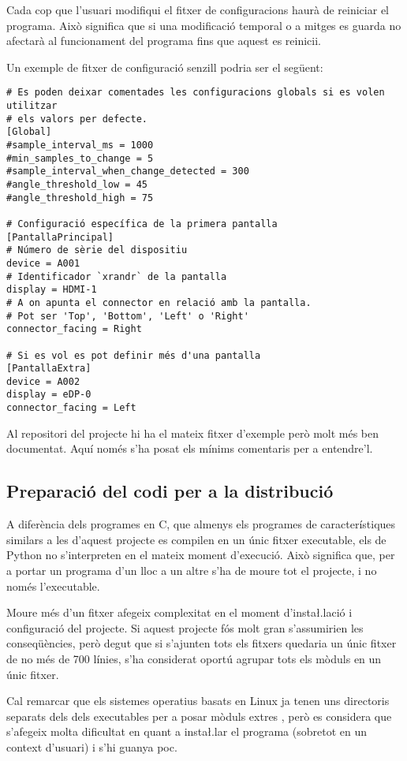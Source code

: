 Cada cop que l'usuari modifiqui el fitxer de configuracions haurà de reiniciar
el programa. Això significa que si una modificació temporal o a mitges es guarda
no afectarà al funcionament del programa fins que aquest es reinicii.

Un exemple de fitxer de configuració senzill podria ser el següent:

\begin{verbatim}
# Es poden deixar comentades les configuracions globals si es volen utilitzar
# els valors per defecte.
[Global]
#sample_interval_ms = 1000
#min_samples_to_change = 5
#sample_interval_when_change_detected = 300
#angle_threshold_low = 45
#angle_threshold_high = 75

# Configuració específica de la primera pantalla
[PantallaPrincipal]
# Número de sèrie del dispositiu
device = A001
# Identificador `xrandr` de la pantalla
display = HDMI-1
# A on apunta el connector en relació amb la pantalla.
# Pot ser 'Top', 'Bottom', 'Left' o 'Right'
connector_facing = Right

# Si es vol es pot definir més d'una pantalla
[PantallaExtra]
device = A002
display = eDP-0
connector_facing = Left
\end{verbatim}

Al repositori del projecte hi ha el mateix fitxer d'exemple però molt més ben
documentat. Aquí només s'ha posat els mínims comentaris per a entendre'l.

\subsection{Preparació del codi per a la distribució}

A diferència dels programes en C, que almenys els programes de característiques
similars a les d'aquest projecte es compilen en un únic fitxer executable, els
 de Python no s'interpreten en el mateix moment d'execució. Això
significa que, per a portar un programa d'un lloc a un altre s'ha de moure tot
el projecte, i no només l'executable.

Moure més d'un fitxer afegeix complexitat en el moment d'insta\l.lació i
configuració del projecte. Si aquest projecte fós molt gran s'assumirien les
conseqüències, però degut que si s'ajunten tots els fitxers quedaria un únic
fitxer de no més de 700 línies, s'ha considerat oportú agrupar tots els mòduls
en un únic fitxer.

Cal remarcar que els sistemes operatius basats en Linux ja tenen uns directoris
separats dels dels executables per a posar mòduls extres \cite{InstallPython3},
però es considera que
s'afegeix molta dificultat en quant a insta\l.lar el programa (sobretot en un
context d'usuari) i s'hi guanya poc.

